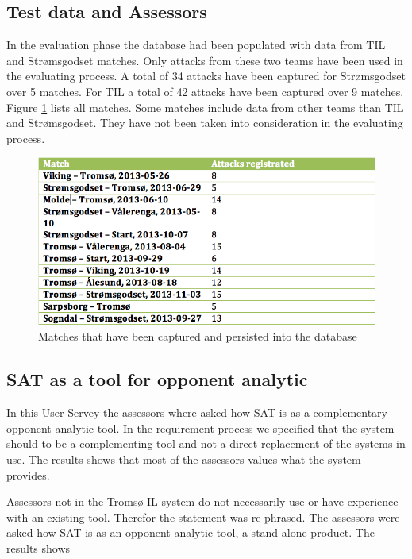 \subsection{Test data and Assessors}

In the evaluation phase the database had been populated with data from \ac{TIL} and Str{\o}msgodset matches. Only attacks from these two teams have been used in the evaluating process. A total of 34 attacks have been captured for Str{\o}msgodset over 5 matches. For \ac{TIL} a total of 42 attacks have been captured over 9 matches. Figure \ref{fig:matches_regged} lists all matches. Some matches include data from other teams than \ac{TIL} and Str{\o}msgodset. They have not been taken into consideration in the evaluating process.

\begin{figure}[ht!]
\centering
\includegraphics[width=1\textwidth]{images/general/matched_regged.png}
\caption{Matches that have been captured and persisted into the database}
\label{fig:matches_regged}
\end{figure}

\subsection{SAT as a tool for opponent analytic}

In this User Servey the assessors where asked how SAT is as a complementary opponent analytic tool. In the requirement process we specified that the system should to be a complementing tool and not a direct replacement of the systems in use. The results shows that most of the assessors values what the system provides. 

Assessors not in the Tromsø IL system do not necessarily use or have experience with an existing tool. Therefor the statement was re-phrased. The assessors were asked how SAT is as an opponent analytic tool, a stand-alone product. The results shows


